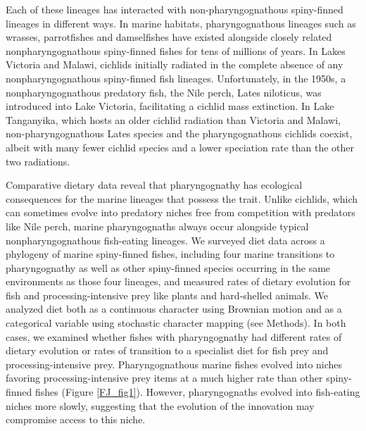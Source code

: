 Each of these lineages has interacted with non-pharyngognathous spiny-finned lineages in different ways. In marine habitats, pharyngognathous lineages such as wrasses, parrotfishes and damselfishes have existed alongside closely related nonpharyngognathous spiny-finned fishes for tens of millions of years. \cite{wainwright_evolution_2012} In Lakes Victoria and Malawi, cichlids initially radiated in the complete absence of any nonpharyngognathous spiny-finned fish lineages. Unfortunately, in the 1950s, a nonpharyngognathous predatory fish, the Nile perch, Lates niloticus, was introduced into Lake Victoria, facilitating a cichlid mass extinction. \cite{witte_destruction_1992} In Lake Tanganyika, which hosts an older cichlid radiation than Victoria and Malawi, non-pharyngognathous Lates species and the pharyngognathous cichlids coexist, albeit with many fewer cichlid species and a lower speciation rate than the other two radiations. \cite{seehausen2006african, tiercelin1991lake}

Comparative dietary data reveal that pharyngognathy has ecological consequences for the marine lineages that possess the trait. Unlike cichlids, which can sometimes evolve into predatory niches free from competition with predators like Nile perch, marine pharyngognaths always occur alongside typical nonpharyngognathous fish-eating lineages. \cite{wainwright_evolution_2012} We surveyed diet data across a phylogeny of marine spiny-finned fishes, including four marine transitions to pharyngognathy as well as other spiny-finned species occurring in the same environments as those four lineages, and measured rates of dietary evolution for fish and processing-intensive prey like plants and hard-shelled animals. We analyzed diet both as a continuous character using Brownian motion and as a categorical variable using stochastic character mapping (see Methods). In both cases, we examined whether fishes with pharyngognathy had different rates of dietary evolution or rates of transition to a specialist diet for fish prey and processing-intensive prey. Pharyngognathous marine fishes evolved into niches favoring processing-intensive prey items at a much higher rate than other spiny-finned fishes (Figure \ref{FJ_fig1}). However, pharyngognaths evolved into fish-eating niches more slowly, suggesting that the evolution of the innovation may compromise access to this niche.

